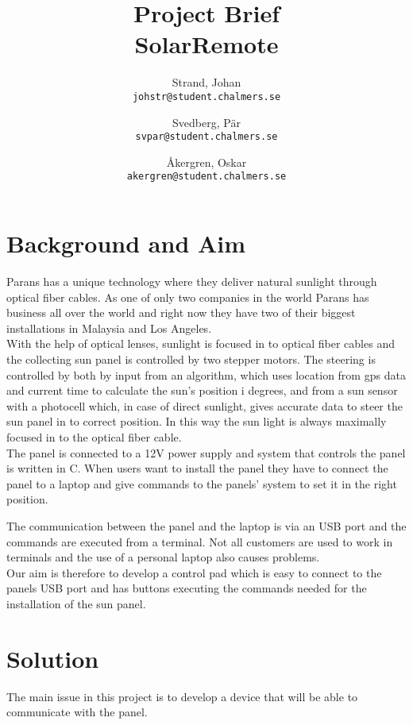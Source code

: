 \documentclass[a4paper]{article}
\author{    Strand, Johan \\ \texttt{johstr@student.chalmers.se} \and
            Svedberg, Pär\\ \texttt{svpar@student.chalmers.se} \and
            Åkergren, Oskar\\ \texttt{akergren@student.chalmers.se}
}
\title{\vspace{-3cm} Project Brief  \\ SolarRemote}
\begin{document}
	\maketitle

	\section*{Background and Aim} %
	\label{sec:background_and_aim}
    	Parans has a unique technology where they deliver natural sunlight through optical fiber cables. As one of only two companies in the world Parans has business all over the world and right now they have two of their biggest installations in Malaysia and Los Angeles. \\

    	\noindent With the help of optical lenses, sunlight is focused in to optical fiber cables and the collecting sun panel is controlled by two stepper motors. The steering is controlled by both by input from an algorithm, which uses location from gps data and current time to calculate the sun's position i degrees, and from a sun sensor with a photocell which, in case of direct sunlight, gives accurate data to steer the sun panel in to correct position. In this way the sun light is always maximally focused in to the optical fiber cable. \\

        \noindent The panel is connected to a 12V power supply and system that controls the panel is written in C. When users want to install the panel they have to connect the panel to a laptop and give commands to the panels' system to set it in the right position.
        
        The communication between the panel and the laptop is via an USB port and the commands are executed from a terminal. Not all customers are used to work in terminals and the use of a personal laptop also causes problems. \\

        \noindent Our aim is therefore to develop a control pad which is easy to connect to the panels USB port and has buttons executing the commands needed for the installation of the sun panel.
        

    \section*{Solution} %
    \label{sec:solution}
        The main issue in this project is to develop a device that will be able to communicate with the panel. \\
\end{document}
